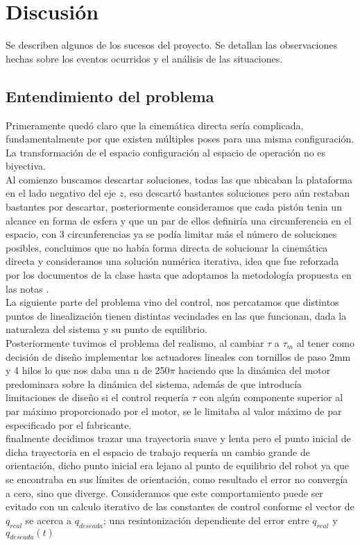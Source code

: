 \section{Discusión}
Se describen algunos de los sucesos del proyecto.
Se detallan las observaciones hechas sobre los eventos ocurridos y
el análisis de las situaciones.

\subsection{Entendimiento del problema}
Primeramente quedó claro que la cinemática directa sería complicada, fundamentalmente por que existen múltiples poses para una misma configuración. La transformación de el espacio configuración al espacio de operación no es biyectiva.\\
Al comienzo buscamos descartar soluciones, todas las que ubicaban la plataforma en el lado negativo del eje $z$, eso descartó bastantes soluciones pero aún restaban bastantes por descartar, posteriormente consideramos que cada pistón tenia un alcance en forma de esfera y que un par de ellos definiría una circunferencia en el espacio, con 3 circunferencias ya se podía limitar más el número de soluciones posibles, concluimos que no había forma directa de solucionar la cinemática directa y consideramos una solución numérica iterativa, idea que fue reforzada por los documentos de la clase hasta que adoptamos la metodología propuesta en las notas \cite{olguin2019}.\\
La siguiente parte del problema vino del control, nos percatamos que distintos puntos de linealización tienen distintas vecindades en las que funcionan, dada la naturaleza del sistema y su punto de equilibrio.\\
Posteriormente tuvimos el problema del realismo, al cambiar $\tau$ a $\tau_m$ al tener como decisión de diseño implementar los actuadores lineales con tornillos de paso 2mm y 4 hilos lo que nos daba una n de 250$\pi$ haciendo que la dinámica del motor predominara sobre la dinámica del sistema, además de que introducía limitaciones de diseño si el control requería $\tau$ con algún componente superior al par máximo proporcionado por el motor, se le limitaba al valor máximo de par especificado por el fabricante.\\
finalmente decidimos trazar una trayectoria suave y lenta pero el punto inicial de dicha trayectoria en el espacio de trabajo requería un cambio grande de orientación, dicho punto inicial era lejano al punto de equilibrio del robot ya que se encontraba en sus límites de orientación, como resultado el error no convergía a cero, sino que diverge. Consideramos que este comportamiento puede ser evitado con un calculo iterativo de las constantes de control conforme el vector de $q_{real}$ se acerca a $q_{deseada}$; una resintonización dependiente del error entre $q_{real}$ y $q_{deseada}(t)$     





